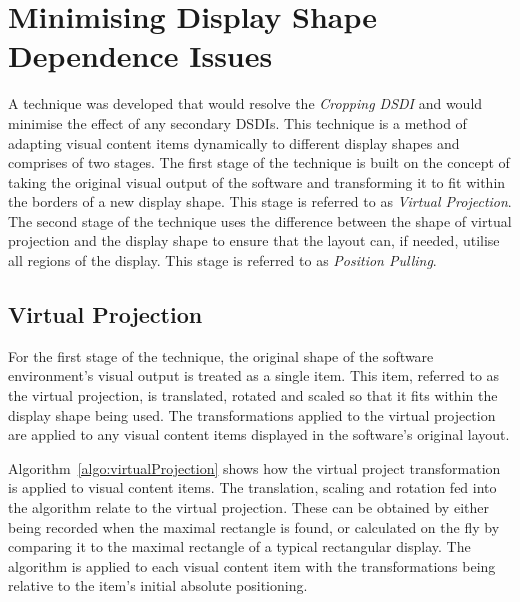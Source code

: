 \documentclass{bmcart}
\begin{document}
\section*{Minimising Display Shape Dependence Issues}
\label{sec:solution}

A technique was developed that would resolve the {\emph{Cropping \ac{DSDI}}} and would minimise the effect of any secondary \acp{DSDI}.
This technique is a method of adapting visual content items dynamically to different display shapes and comprises of two stages.
The first stage of the technique is built on the concept of taking the original visual output of the software and transforming it to fit within the borders of a new display shape.
This stage is referred to as {\em Virtual Projection}.
The second stage of the technique uses the difference between the shape of virtual projection and the display shape to ensure that the layout can, if needed, utilise all regions of the display.
This stage is referred to as {\em Position Pulling}.


\subsection*{Virtual Projection}
\label{subsec:virtualprojection}




For the first stage of the technique, the original shape of the software environment's visual output is treated as a single item.
This item, referred to as the virtual projection, is translated, rotated and scaled so that it fits within the display shape being used.
The transformations applied to the virtual projection are applied to any visual content items displayed in the software's original layout.


Algorithm~\ref{algo:virtualProjection} shows how the virtual project transformation is applied to visual content items.
The translation, scaling and rotation fed into the algorithm relate to the virtual projection.
These can be obtained by either being recorded when the maximal rectangle is found, or calculated on the fly by comparing it to the maximal rectangle of a typical rectangular display.
The algorithm is applied to each visual content item with the transformations being relative to the item's initial absolute positioning.
\end{document}
